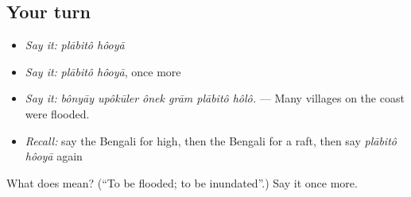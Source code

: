 \subsection*{Your turn}
\begin{itemize}
\raggedright
  \item \emph{Say it:} \emph{plābitô hôoyā}
  \item \emph{Say it:} \emph{plābitô hôoyā}, once more
  \item \emph{Say it:} \emph{bônyāy upôkūler ônek grām plābitô hôlô.} — Many villages on the coast were flooded.
  \item \emph{Recall:} say the Bengali for high, then the Bengali for a raft, then say \emph{plābitô hôoyā} again
\end{itemize}

\begin{tcolorbox}[breakable,colback=teal!4,colframe=teal!35!black,title={Before you move on}]
What does   mean? (\textquotedblleft{}To be flooded; to be inundated\textquotedblright{}.) Say it once more.
\end{tcolorbox}
